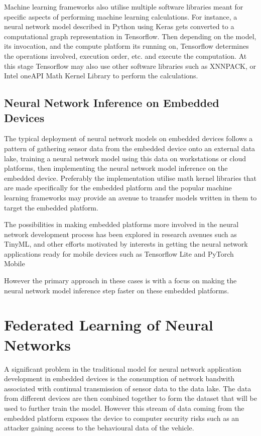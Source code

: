 Machine learning frameworks also utilise multiple software libraries meant for specific aspects of performing machine learning calculations. For instance, a neural network model described in Python using Keras gets converted to a computational graph representation in Tensorflow. Then depending on the model, its invocation, and the compute platform its running on, Tensorflow determines the operations involved, execution order, etc. and execute the computation. At this stage Tensorflow may also use other software libraries such as XNNPACK, or Intel oneAPI Math Kernel Library to perform the calculations.


\subsection{Neural Network Inference on Embedded Devices}

The typical deployment of neural network models on embedded devices follows a pattern of gathering sensor data from the embedded device onto an external data lake, training a neural network model using this data on workstations or cloud platforms, then implementing the neural network model inference on the embedded device. Preferably the implementation utilise math kernel libraries that are made specifically for the embedded platform and the popular machine learning frameworks may provide an avenue to transfer models written in them to target the embedded platform.

The possibilities in making embedded platforms more involved in the neural network development process has been explored in research avenues such as TinyML\cite{tinyml}, and other efforts motivated by interests in getting the neural network applications ready for mobile devices such as Tensorflow Lite\cite{tfl} and PyTorch Mobile \cite{pytorch-mobile}

However the primary approach in these cases is with a focus on making the neural network model inference step faster on these embedded platforms.


\section{Federated Learning of Neural Networks}

A significant problem in the traditional model for neural network application development in embedded devices is the consumption of network bandwith associated with continual transmission of sensor data to the data lake. The data from different devices are then combined together to form the dataset that will be used to further train the model. However this stream of data coming from the embedded platform exposes the device to computer security risks such as an attacker gaining access to the behavioural data of the vehicle.

